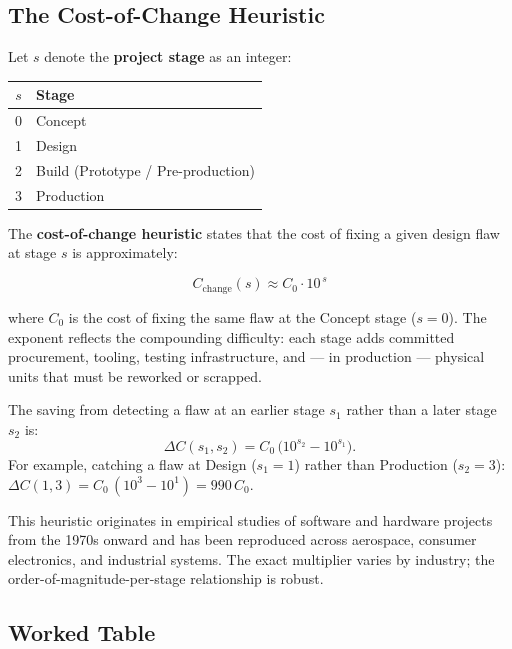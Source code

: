 \subsection{The Cost-of-Change Heuristic}

Let $s$ denote the \textbf{project stage} as an integer:

\begin{center}
\begin{tabular}{cl}
\toprule
$s$ & Stage \\
\midrule
0 & Concept \\
1 & Design \\
2 & Build (Prototype / Pre-production) \\
3 & Production \\
\bottomrule
\end{tabular}
\end{center}

The \textbf{cost-of-change heuristic} states
that the cost of fixing a given design flaw at stage $s$ is approximately:

\begin{equation}
  C_{\text{change}}(s) \approx C_0 \cdot 10^{\,s}
  \label{eq:ch3-cost-of-change}
\end{equation}

where $C_0$ is the cost of fixing the same flaw at
the Concept stage ($s = 0$).
The exponent reflects the compounding difficulty: each stage adds committed
procurement, tooling, testing infrastructure, and --- in production ---
physical units that must be reworked or scrapped.

The saving from detecting a flaw at an earlier stage $s_1$ rather than a later
stage $s_2$ is:
\begin{equation}
  \Delta C(s_1, s_2) = C_0\,\bigl(10^{s_2} - 10^{s_1}\bigr).
  \label{eq:ch3-delta-cost}
\end{equation}
For example, catching a flaw at Design ($s_1=1$) rather than Production ($s_2=3$):
$\Delta C(1,3) = C_0\,(10^3 - 10^1) = 990\,C_0$.

This heuristic originates in empirical studies of software and hardware
projects from the 1970s onward and has been reproduced across aerospace,
consumer electronics, and industrial systems.
The exact multiplier varies by industry; the order-of-magnitude-per-stage
relationship is robust.

\subsection{Worked Table}


